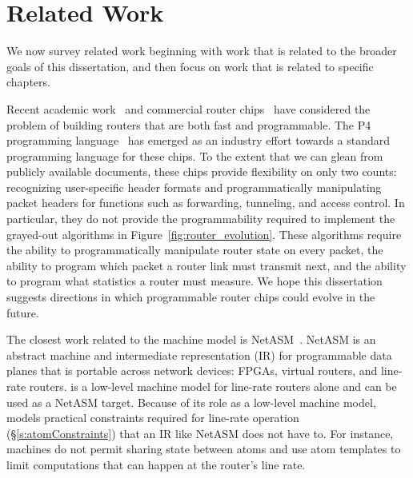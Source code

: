 \chapter{Related Work}
\label{chap:related}

We now survey related work beginning with work that is related to the broader
goals of this dissertation, and then focus on work that is related to specific
chapters.

Recent academic work~\cite{rmt} and commercial router chips~\cite{tofino,
flexpipe, xpliant} have considered the problem of building routers that are
both fast and programmable. The P4 programming language~\cite{p4} has emerged
as an industry effort towards a standard programming language for these chips.
To the extent that we can glean from publicly available documents, these chips
provide flexibility on only two counts: recognizing user-specific header
formats and programmatically manipulating packet headers for functions such as
forwarding, tunneling, and access control. In particular, they do not provide
the programmability required to implement the grayed-out algorithms in
Figure~\ref{fig:router_evolution}.  These algorithms require the ability to
programmatically manipulate router state on every packet, the ability to
program which packet a router link must transmit next, and the ability to
program what statistics a router must measure. We hope this
dissertation suggests directions in which programmable router
 chips could evolve in the future.

The closest work related to the \absmachine machine model is
NetASM~\cite{netasm}. NetASM is an abstract machine and intermediate
representation (IR) for programmable data planes that is portable across
network devices: FPGAs, virtual routers, and line-rate routers.  \absmachine
is a low-level machine model for line-rate routers alone and can be used as a
NetASM target. Because of its role as a low-level machine model, \absmachine
models practical constraints required for line-rate operation
(\S\ref{s:atomConstraints}) that an IR like NetASM does not have to. For
instance, \absmachine machines do not permit sharing state between atoms and use
atom templates to limit computations that can happen at the router's line rate.

